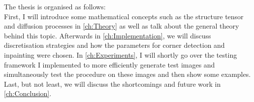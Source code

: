 The thesis is organised as follows:\\
First, I will introduce some mathematical concepts such as the structure tensor and diffusion
processes in \ref{ch:Theory} as well as talk about the general theory behind this topic.
Afterwards in \ref{ch:Implementation}, we will discuss discretisation strategies and how the
parameters for corner detection and inpainting were chosen.
In \ref{ch:Experiments}, I will shortly go over the testing framework I implemented to more efficiently
generate test images and simultaneously test the procedure on these images and then show some
examples.
Last, but not least, we will discuss the shortcomings and future work in \ref{ch:Conclusion}.
